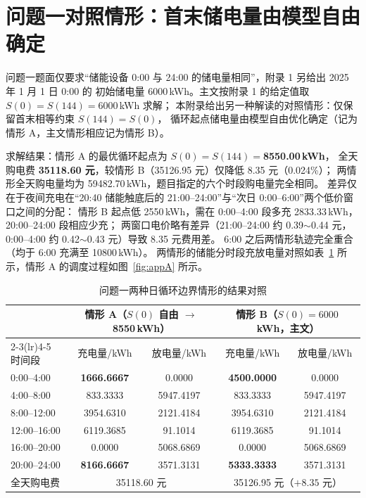 \section{问题一对照情形：首末储电量由模型自由确定}

问题一题面仅要求“储能设备 0:00 与 24:00 的储电量相同”，附录 1 另给出 2025 年 1 月 1 日 0:00 的
初始储电量 6000\,kWh。主文按附录 1 的给定值取 $S(0)=S(144)=6000$\,kWh 求解；
本附录给出另一种解读的对照情形：仅保留首末相等约束 $S(144)=S(0)$，
循环起点储电量由模型自由优化确定（记为情形 A，主文情形相应记为情形 B）。

求解结果：情形 A 的最优循环起点为 $S(0)=S(144)=$\textbf{8550.00\,kWh}，
全天购电费 \textbf{35118.60 元}，较情形 B（35126.95 元）仅降低 8.35 元（0.024\%）；
两情形全天购电量均为 59482.70\,kWh，题目指定的六个时段购电量完全相同。
差异仅在于夜间充电在“20:40 储能触底后的 21:00--24:00”与“次日 0:00--6:00”两个低价窗口之间的分配：
情形 B 起点低 2550\,kWh，需在 0:00--4:00 段多充 2833.33\,kWh，20:00--24:00 段相应少充；
两窗口电价略有差异（21:00--24:00 约 0.39$\sim$0.44 元，0:00--4:00 约 0.42$\sim$0.43 元）导致 8.35 元费用差。
6:00 之后两情形轨迹完全重合（均于 6:00 充满至 10800\,kWh）。
两情形的储能分时段充放电量对照如表~\ref{tab:appA-soc} 所示，情形 A 的调度过程如图~\ref{fig:appA} 所示。

\begin{table}[!htbp]
\caption{问题一两种日循环边界情形的结果对照}\label{tab:appA-soc}
\centering
\small
\setlength{\tabcolsep}{4pt}
\begin{tabular}{lcccc}
\toprule
 & \multicolumn{2}{c}{情形 A（$S(0)$ 自由 $\to$ 8550\,kWh）} & \multicolumn{2}{c}{情形 B（$S(0)=6000$\,kWh，主文）} \\
\cmidrule(lr){2-3}\cmidrule(lr){4-5}
时间段 & 充电量/kWh & 放电量/kWh & 充电量/kWh & 放电量/kWh \\
\midrule
0:00--4:00   & \textbf{1666.6667} & 0.0000    & \textbf{4500.0000} & 0.0000 \\
4:00--8:00   & 833.3333  & 5947.4197 & 833.3333  & 5947.4197 \\
8:00--12:00  & 3954.6310 & 2121.4184 & 3954.6310 & 2121.4184 \\
12:00--16:00 & 6119.3685 & 91.1014   & 6119.3685 & 91.1014 \\
16:00--20:00 & 0.0000    & 5068.6869 & 0.0000    & 5068.6869 \\
20:00--24:00 & \textbf{8166.6667} & 3571.3131 & \textbf{5333.3333} & 3571.3131 \\
\midrule
全天购电费   & \multicolumn{2}{c}{35118.60 元} & \multicolumn{2}{c}{35126.95 元（$+8.35$ 元）} \\
\bottomrule
\end{tabular}
\end{table}

